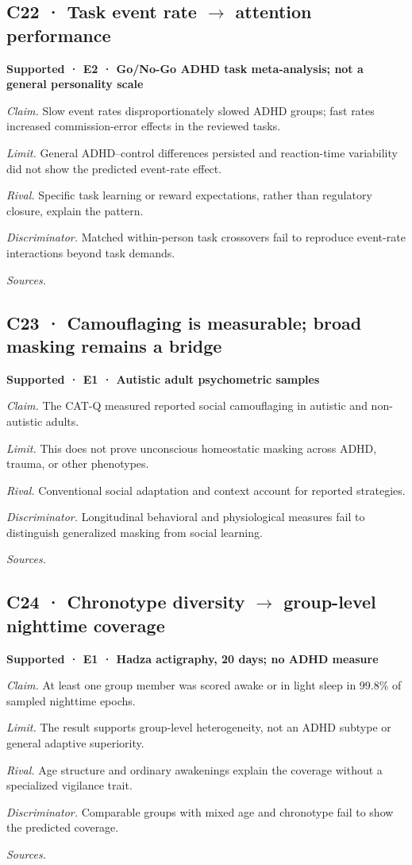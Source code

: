 \subsection*{C22 · Task event rate \ensuremath{\rightarrow} attention performance}
\noindent\textbf{Supported · E2 · Go/No-Go ADHD task meta-analysis; not a general personality scale}\par
\textit{Claim.} Slow event rates disproportionately slowed ADHD groups; fast rates increased commission-error effects in the reviewed tasks.\par
\textit{Limit.} General ADHD–control differences persisted and reaction-time variability did not show the predicted event-rate effect.\par
\textit{Rival.} Specific task learning or reward expectations, rather than regulatory closure, explain the pattern.\par
\textit{Discriminator.} Matched within-person task crossovers fail to reproduce event-rate interactions beyond task demands.\par
\textit{Sources.} \cite{ref27}\par
\subsection*{C23 · Camouflaging is measurable; broad masking remains a bridge}
\noindent\textbf{Supported · E1 · Autistic adult psychometric samples}\par
\textit{Claim.} The CAT-Q measured reported social camouflaging in autistic and non-autistic adults.\par
\textit{Limit.} This does not prove unconscious homeostatic masking across ADHD, trauma, or other phenotypes.\par
\textit{Rival.} Conventional social adaptation and context account for reported strategies.\par
\textit{Discriminator.} Longitudinal behavioral and physiological measures fail to distinguish generalized masking from social learning.\par
\textit{Sources.} \cite{ref32}\par
\subsection*{C24 · Chronotype diversity \ensuremath{\rightarrow} group-level nighttime coverage}
\noindent\textbf{Supported · E1 · Hadza actigraphy, 20 days; no ADHD measure}\par
\textit{Claim.} At least one group member was scored awake or in light sleep in 99.8\% of sampled nighttime epochs.\par
\textit{Limit.} The result supports group-level heterogeneity, not an ADHD subtype or general adaptive superiority.\par
\textit{Rival.} Age structure and ordinary awakenings explain the coverage without a specialized vigilance trait.\par
\textit{Discriminator.} Comparable groups with mixed age and chronotype fail to show the predicted coverage.\par
\textit{Sources.} \cite{ref28}\par
